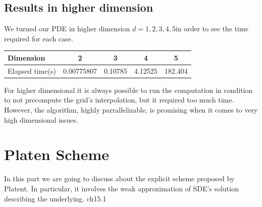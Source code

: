 \documentclass[a4paper,10pt]{article}
\begin{document}
\subsection{Results in higher dimension}
We turned our PDE in higher dimension $d=1,2,3,4,5$in order to see the time required for each case.
\begin{center}
\begin{tabular}{l|c|c|c|c}
Dimension   &  2          & 3       & 4       & 5  \\
\hline\hline
Elapsed time(s)  &  0.00775807 & 0.10785 & 4.12525 & 182.404 \\
\end{tabular}
\end{center}
For higher dimensional it is always possible to run the computation in condition to not precompute the grid's interpolation, but it required too much time. However, the algorithm, highly parrallelizable, is promising when it comes to very high dimensional issues.    
\section{Platen Scheme }
In this part we are going to discuss about the explicit scheme proposed by Platent. In particular, it involves the weak approximation of SDE's solution describing the underlying. \cite{Platen}ch15.1
\end{document}
